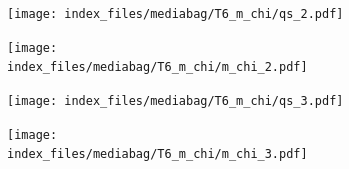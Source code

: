 \documentclass[
  11pt,
  letterpaper,
]{scrreprt}
\begin{document}
\begin{figure}

\begin{minipage}{0.50\linewidth}

\begin{figure}[H]

{\centering \texttt{[image: index\_files/mediabag/T6\_m\_chi/qs\_2.pdf]}

}


\end{figure}%

\end{minipage}%
%
\begin{minipage}{0.50\linewidth}

\begin{figure}[H]

{\centering \texttt{[image: index\_files/mediabag/T6\_m\_chi/m\_chi\_2.pdf]}

}


\end{figure}%

\end{minipage}%

\end{figure}%

\begin{figure}

\begin{minipage}{0.50\linewidth}

\begin{figure}[H]

{\centering \texttt{[image: index\_files/mediabag/T6\_m\_chi/qs\_3.pdf]}

}


\end{figure}%

\end{minipage}%
%
\begin{minipage}{0.50\linewidth}

\begin{figure}[H]

{\centering \texttt{[image: index\_files/mediabag/T6\_m\_chi/m\_chi\_3.pdf]}

}


\end{figure}%

\end{minipage}%

\end{figure}%
\end{document}
